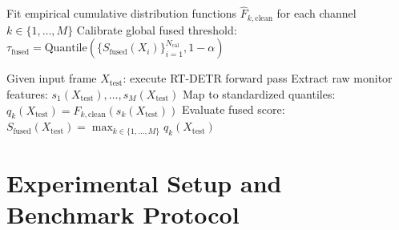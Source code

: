 \documentclass[preprint,12pt]{elsarticle}
\begin{document}
\begin{algorithm}[t]
\caption{Calibrated Extreme-Value Max-OR Guardrail Pipeline}
\label{alg:calibrated_max_or}

Fit empirical cumulative distribution functions $\hat{F}_{k, \mathrm{clean}}$ for each channel $k \in \{1, \dots, M\}$\;
Calibrate global fused threshold: $\tau_{\mathrm{fused}} = \mathrm{Quantile}(\{S_{\mathrm{fused}}(X_i)\}_{i=1}^{N_{\mathrm{cal}}}, 1 - \alpha)$\;

Given input frame $X_{\mathrm{test}}$: execute RT-DETR forward pass\;
Extract raw monitor features: $s_1(X_{\mathrm{test}}), \dots, s_M(X_{\mathrm{test}})$\;
Map to standardized quantiles: $q_k(X_{\mathrm{test}}) = \hat{F}_{k, \mathrm{clean}}(s_k(X_{\mathrm{test}}))$\;
Evaluate fused score: $S_{\mathrm{fused}}(X_{\mathrm{test}}) = \max_{k \in \{1, \dots, M\}} q_k(X_{\mathrm{test}})$\;
\end{algorithm}

\section{Experimental Setup and Benchmark Protocol}
\label{sec:experimental_setup}
\end{document}
